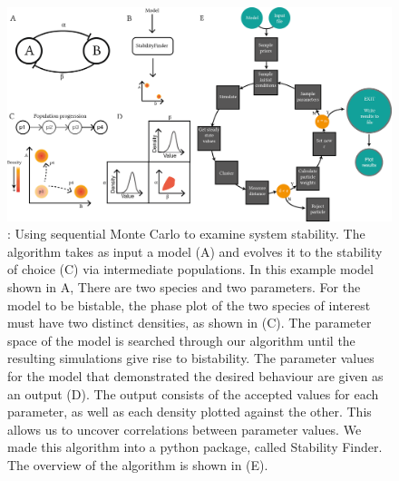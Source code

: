 {\begin{figure}[h]
\begin{center}
\includegraphics[scale=0.9]{chapterStabilityFinder/images/SF_algo_overv.png}
\caption[LoF caption]{\label{fig:fig1}: Using sequential Monte Carlo to examine system stability. The algorithm takes as input a model (A) and evolves it to the stability of choice (C) via intermediate populations. In this example model shown in A, There are two species and two parameters. For the model to be bistable, the phase plot of the two species of interest must have two distinct densities, as shown in (C). The parameter space of the model is searched through our algorithm until the resulting simulations give rise to bistability. The parameter values for the model that demonstrated the desired behaviour are given as an output (D). The output consists of the accepted values for each parameter, as well as each density plotted against the other. This allows us to uncover correlations between parameter values. We made this algorithm into a python package, called Stability Finder. The overview of the algorithm is shown in (E).}
\end{center}
\end{figure}
\clearpage


}
